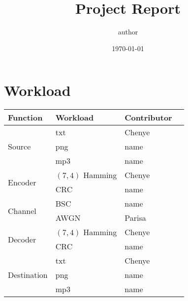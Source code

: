 \documentclass{article}
\title{Project Report}
\author{author}
\date{\today}
\begin{document}
\maketitle

\section{Workload}


\begin{center}
    \begin{tabularx}{\textwidth}{ |X|X|X|X| } 
    \hline
    Function & Workload & Contributor \\
    \hline
    \multirow{3}{4em}{Source} & txt & Chenye \\ 
    & png & name \\ 
    & mp3 & name \\ 
    \hline
    \multirow{2}{4em}{Encoder} & $(7,4)$ Hamming & Chenye \\ 
    & CRC & name \\ 
    \hline
    \multirow{2}{4em}{Channel} & BSC & name \\ 
    & AWGN & Parisa \\ 
    \hline
    \multirow{2}{4em}{Decoder} & $(7,4)$ Hamming & Chenye \\ 
    & CRC & name \\ 
    \hline
    \multirow{3}{4em}{Destination} & txt & Chenye \\ 
    & png & name \\ 
    & mp3 & name \\ 
    \hline
    \end{tabularx}
\end{center}
\end{document}
